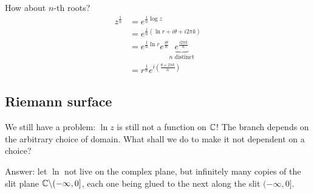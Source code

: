 \documentclass[12pt]{article}
\begin{document}
How about $n$-th roots?
\begin{align*}
    z^{\frac{1}{n}} &= e^{\frac{1}{n}\log z}\\
    &= e^{\frac{1}{n}(\ln r+i\theta+i2\pi k)}\\
    &= e^{\frac{1}{n}\ln r}e^{\frac{i\theta}{n}}\underset{\text{$n$ distinct}}{\underbrace{e^{\frac{i2\pi k}{n}}}}\\
    &= r^{\frac{1}{n}} e^{i\left(\frac{\theta+2\pi k}{n}\right)}
\end{align*}

\subsection{Riemann surface}
We still have a problem: $\ln z$ is still not a function on $\mathbb{C}$! The branch depends on the arbitrary choice of domain. What shall we do to make it not dependent on a choice?

Answer: let $\ln$ not live on the complex plane, but  infinitely many copies of the slit plane $\mathbb{C}\backslash(-\infty, 0]$, each
one being glued to the next along the slit $(-\infty, 0]$.
\end{document}
